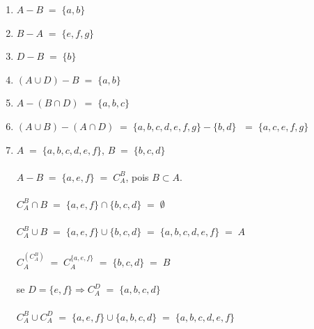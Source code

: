 \begin{enumerate}
\item 
$ A - B \; = \; \{ a,b \}$ \\
			
\item 
$ B - A \; = \; \{ e, f, g \} $ \\
		
\item 
$ D - B \; = \; \{ b \} $ \\
		
\item 
$ (A \cup D) - B\; = \; \{  a, b \}  $ \\
		
\item 
$ A - (B \cap D) \; = \;\{ a, b, c \} $ \\
		
\item 
$  (A \cup B) - ( A \cap D) \; = \; \{ a, b, c, d, e, f, g \} - \{ b, d \} \; $
$ = \; \{ a, c, e, f, g \} $ \\
		
\item 
$ A \; = \; \{ a, b, c, d, e, f \}$, $ B \; = \; \{ b, c, d \} $ \\ \\

$ A - B \; = \; \{ a, e, f \} \; = \; C_A^B $, pois $ B \subset A $. \\ \\

$ C_A^B \cap B \; = \; \{ a, e, f \} \cap \{b, c, d\} \; = \; \emptyset $ \\ \\

$ C_A^B \cup B \; = \; \{ a, e, f \} \cup \{ b, c, d \} \; = \; \{ a, b, c, d, e, f \} \; = \; A $ \\ \\

$ C_A^{(C_ A^B)} \; = \; C_A^{\{ a, e, f \}} \; = \; \{ b, c, d \} \; = \; B $  \\ \\

se $ D = \{e, f\} \Rightarrow C_A^D \; = \; \{ a, b, c, d \}  $ \\ \\

$ C_A^B \cup C_A^D \; = \; \{ a, e, f \} \cup \{ a, b, c, d \} \; = \; \{ a, b, c, d, e, f \} $ \\ \\


\end{enumerate}
